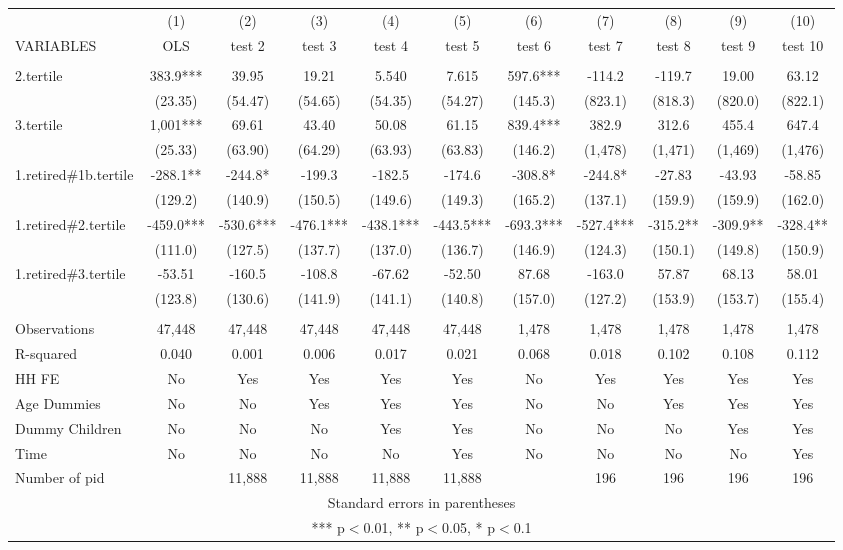 \begin{tabular}{lcccccccccc} \hline
 & (1) & (2) & (3) & (4) & (5) & (6) & (7) & (8) & (9) & (10) \\
VARIABLES & OLS & test 2 & test 3 & test 4 & test 5 & test 6 & test 7 & test 8 & test 9 & test 10 \\ \hline
 &  &  &  &  &  &  &  &  &  &  \\
2.tertile & 383.9*** & 39.95 & 19.21 & 5.540 & 7.615 & 597.6*** & -114.2 & -119.7 & 19.00 & 63.12 \\
 & (23.35) & (54.47) & (54.65) & (54.35) & (54.27) & (145.3) & (823.1) & (818.3) & (820.0) & (822.1) \\
3.tertile & 1,001*** & 69.61 & 43.40 & 50.08 & 61.15 & 839.4*** & 382.9 & 312.6 & 455.4 & 647.4 \\
 & (25.33) & (63.90) & (64.29) & (63.93) & (63.83) & (146.2) & (1,478) & (1,471) & (1,469) & (1,476) \\
1.retired\#1b.tertile & -288.1** & -244.8* & -199.3 & -182.5 & -174.6 & -308.8* & -244.8* & -27.83 & -43.93 & -58.85 \\
 & (129.2) & (140.9) & (150.5) & (149.6) & (149.3) & (165.2) & (137.1) & (159.9) & (159.9) & (162.0) \\
1.retired\#2.tertile & -459.0*** & -530.6*** & -476.1*** & -438.1*** & -443.5*** & -693.3*** & -527.4*** & -315.2** & -309.9** & -328.4** \\
 & (111.0) & (127.5) & (137.7) & (137.0) & (136.7) & (146.9) & (124.3) & (150.1) & (149.8) & (150.9) \\
1.retired\#3.tertile & -53.51 & -160.5 & -108.8 & -67.62 & -52.50 & 87.68 & -163.0 & 57.87 & 68.13 & 58.01 \\
 & (123.8) & (130.6) & (141.9) & (141.1) & (140.8) & (157.0) & (127.2) & (153.9) & (153.7) & (155.4) \\
 &  &  &  &  &  &  &  &  &  &  \\
Observations & 47,448 & 47,448 & 47,448 & 47,448 & 47,448 & 1,478 & 1,478 & 1,478 & 1,478 & 1,478 \\
R-squared & 0.040 & 0.001 & 0.006 & 0.017 & 0.021 & 0.068 & 0.018 & 0.102 & 0.108 & 0.112 \\
HH FE & No & Yes & Yes & Yes & Yes & No & Yes & Yes & Yes & Yes \\
Age Dummies & No & No & Yes & Yes & Yes & No & No & Yes & Yes & Yes \\
Dummy Children & No & No & No & Yes & Yes & No & No & No & Yes & Yes \\
Time & No & No & No & No & Yes & No & No & No & No & Yes \\
 Number of pid &  & 11,888 & 11,888 & 11,888 & 11,888 &  & 196 & 196 & 196 & 196 \\ \hline
\multicolumn{11}{c}{ Standard errors in parentheses} \\
\multicolumn{11}{c}{ *** p$<$0.01, ** p$<$0.05, * p$<$0.1} \\
\end{tabular}
